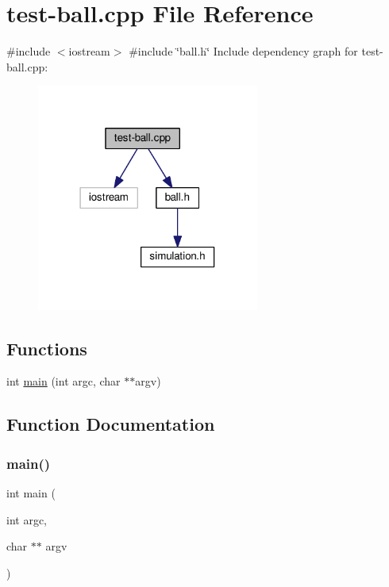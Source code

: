 \hypertarget{test-ball_8cpp}{}\section{test-\/ball.cpp File Reference}
\label{test-ball_8cpp}
{\ttfamily \#include $<$iostream$>$}\newline
{\ttfamily \#include \char`\"{}ball.\+h\char`\"{}}\newline
Include dependency graph for test-\/ball.cpp\+:
\nopagebreak
\begin{figure}[H]
\begin{center}
\leavevmode
\includegraphics[width=207pt]{test-ball_8cpp__incl}
\end{center}
\end{figure}
\subsection*{Functions}
\begin{DoxyCompactItemize}
\item 
int \hyperlink{test-ball_8cpp_a3c04138a5bfe5d72780bb7e82a18e627}{main} (int argc, char $\ast$$\ast$argv)
\end{DoxyCompactItemize}


\subsection{Function Documentation}
\mbox{\label{test-ball_8cpp_a3c04138a5bfe5d72780bb7e82a18e627}} 
\subsubsection{\texorpdfstring{main()}{main()}}
{\footnotesize\ttfamily int main (\begin{DoxyParamCaption}\item[{int}]{argc,  }\item[{char $\ast$$\ast$}]{argv }\end{DoxyParamCaption})}

